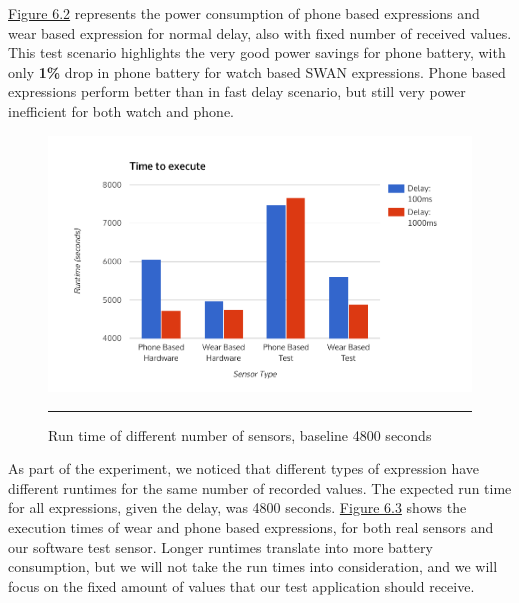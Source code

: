 \hyperref[fig:phone_vs_wear_1000]{Figure 6.2} represents the power consumption of phone based expressions and wear based expression for normal delay, also
with fixed number of received values. This test scenario highlights the very good power savings for phone battery, with only \textbf{1\%} drop in phone battery for watch based SWAN
expressions. Phone based expressions perform better than in fast delay scenario, but still very power inefficient for both watch and phone.

 \begin{figure}[htbp]
  \centering
    \includegraphics[scale=0.8]{Figures/execution_times.pdf}
    \rule{35em}{0.5pt}
  \caption[Run time of different number of sensors, baseline 4800 seconds]{Run time of different number of sensors, baseline 4800 seconds}
  \label{fig:execution_times}
\end{figure}

As part of the experiment, we noticed that different types of expression have different runtimes for the same number of recorded values. The expected run time for all expressions,
given the delay, was 4800 seconds. \hyperref[fig:execution_times]{Figure 6.3} shows the execution times of wear and phone based expressions, for both real sensors and our software test sensor.
Longer runtimes translate into more battery consumption, but we will not take the run times into consideration, and we will focus on the fixed amount of values that our test application should receive.

